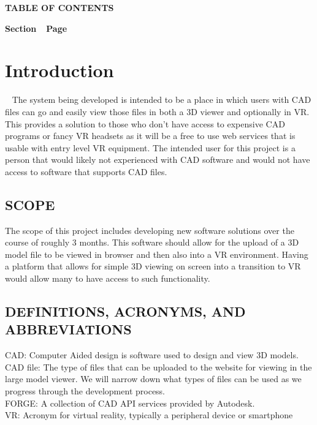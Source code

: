 \documentclass[letterpaper, 10pt, draftclsnofoot, compsoc, onecolumn]{IEEEtran}
\begin{document}
{\centering{}\bfseries\color{black}
TABLE OF CONTENTS
\par}


\bigskip

{\bfseries\color{black}
Section\ \ Page}

\setcounter{tocdepth}{9}
\renewcommand\contentsname{}
\tableofcontents

\bigskip



\clearpage\clearpage\setcounter{page}{1}\pagestyle{Convertii}
\section[Introduction]{\rmfamily\bfseries\color{black}
Introduction}

\foreignlanguage{english}{\textit{}}\foreignlanguage{english}{ \ }
{\color{black}
The system being developed is intended to be a place in which users with CAD files can go and easily view those files in both a 3D viewer and optionally in VR. This provides a solution to those who don't have access to expensive CAD programs or fancy VR headsets as it will be a free to use web services that is usable with entry level VR equipment. The intended user for this project is a person that would likely not experienced with CAD software and would not have access to software that supports CAD files.  }


\subsection[SCOPE]{\rmfamily\bfseries\color{black}
SCOPE}
{\color{black}
The scope of this project includes developing new software solutions over the course of roughly 3 months. This software should allow for the upload of a 3D model file to be viewed in browser and then also into a VR environment. Having a platform that allows for simple 3D viewing on screen into a transition to VR would allow many to have access to such functionality. }

\subsection[DEFINITIONS, ACRONYMS, AND
ABBREVIATIONS]{\rmfamily\bfseries\color{black}
DEFINITIONS, ACRONYMS, AND ABBREVIATIONS}
{\color{black}
	CAD: Computer Aided design is software used to design and view 3D models.\\
	CAD file: The type of files that can be uploaded to the website for viewing in the large model viewer.
	We will  narrow down what types of files can be used as we progress through the development process.\\
	FORGE: A collection of CAD API services provided by Autodesk.\\
	VR: Acronym for virtual reality, typically a peripheral device or smartphone\\
}
\end{document}
